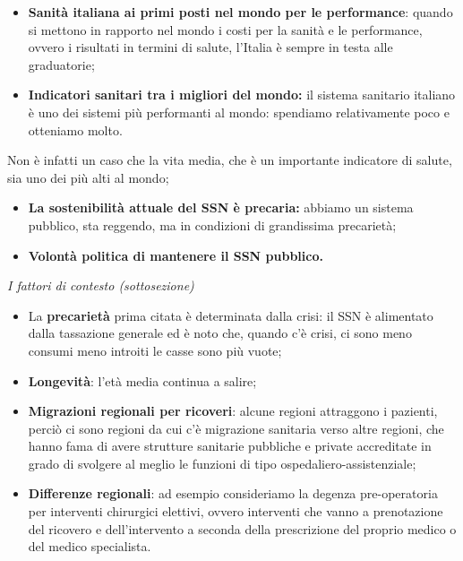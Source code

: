 \documentclass[]{article}
\begin{document}
\begin{itemize}
\item
  \textbf{Sanità italiana ai primi posti nel mondo per le performance}:
  quando si mettono in rapporto nel mondo i costi per la sanità e le
  performance, ovvero i risultati in termini di salute, l'Italia è
  sempre in testa alle graduatorie;
\item
  \textbf{Indicatori sanitari tra i migliori del mondo:} il sistema
  sanitario italiano è uno dei sistemi più performanti al mondo:
  spendiamo relativamente poco e otteniamo molto.
\end{itemize}

Non è infatti un caso che la vita media, che è un importante indicatore
di salute, sia uno dei più alti al mondo;

\begin{itemize}
\item
  \textbf{La sostenibilità attuale del SSN è precaria:} abbiamo un
  sistema pubblico, sta reggendo, ma in condizioni di grandissima
  precarietà;
\item
  \textbf{Volontà politica di mantenere il SSN pubblico.}
\end{itemize}

\emph{I fattori di contesto (sottosezione)}

\begin{itemize}
\item
  La \textbf{precarietà} prima citata è determinata dalla crisi: il SSN
  è alimentato dalla tassazione generale ed è noto che, quando c'è
  crisi, ci sono meno consumi meno introiti le casse sono più vuote;
\item
  \textbf{Longevità}: l'età media continua a salire;
\item
  \textbf{Migrazioni regionali per ricoveri}: alcune regioni attraggono
  i pazienti, perciò ci sono regioni da cui c'è migrazione sanitaria
  verso altre regioni, che hanno fama di avere strutture sanitarie
  pubbliche e private accreditate in grado di svolgere al meglio le
  funzioni di tipo ospedaliero-assistenziale;
\item
  \textbf{Differenze regionali}: ad esempio consideriamo la degenza
  pre-operatoria per interventi chirurgici elettivi, ovvero interventi
  che vanno a prenotazione del ricovero e dell'intervento a seconda
  della prescrizione del proprio medico o del medico specialista.
\end{itemize}
\end{document}
